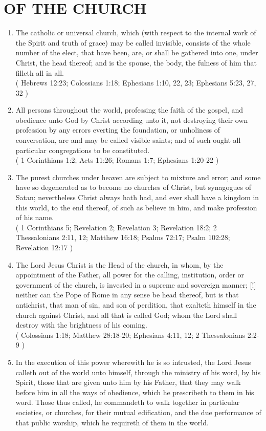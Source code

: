 \documentclass[12pt,a4paper]{book}
\begin{document}
\chapter{OF THE CHURCH}
\label{ch-chu}
\begin{enumerate}
\item The catholic or universal church, which (with respect to the internal work of the Spirit and truth of grace) may be called invisible, consists of the whole number of the elect, that have been, are, or shall be gathered into one, under Christ, the head thereof; and is the spouse, the body, the fulness of him that filleth all in all.\\
( Hebrews 12:23; Colossians 1:18; Ephesians 1:10, 22, 23; Ephesians 5:23, 27, 32 )
\item All persons throughout the world, professing the faith of the gospel, and obedience unto God by Christ according unto it, not destroying their own profession by any errors everting the foundation, or unholiness of conversation, are and may be called visible saints; and of such ought all particular congregations to be constituted.\\
( 1 Corinthians 1:2; Acts 11:26; Romans 1:7; Ephesians 1:20-22 )
\item The purest churches under heaven are subject to mixture and error; and some have so degenerated as to become no churches of Christ, but synagogues of Satan; nevertheless Christ always hath had, and ever shall have a kingdom in this world, to the end thereof, of such as believe in him, and make profession of his name.\\
( 1 Corinthians 5; Revelation 2; Revelation 3; Revelation 18:2; 2 Thessalonians 2:11, 12; Matthew 16:18; Psalms 72:17; Psalm 102:28; Revelation 12:17 )
\item The Lord Jesus Christ is the Head of the church, in whom, by the appointment of the Father, all power for the calling, institution, order or government of the church, is invested in a supreme and sovereign manner; [!] neither can the Pope of Rome in any sense be head thereof, but is that antichrist, that man of sin, and son of perdition, that exalteth himself in the church against Christ, and all that is called God; whom the Lord shall destroy with the brightness of his coming.\\
( Colossians 1:18; Matthew 28:18-20; Ephesians 4:11, 12; 2 Thessalonians 2:2-9 )
\item In the execution of this power wherewith he is so intrusted, the Lord Jesus calleth out of the world unto himself, through the ministry of his word, by his Spirit, those that are given unto him by his Father, that they may walk before him in all the ways of obedience, which he prescribeth to them in his word. Those thus called, he commandeth to walk together in particular societies, or churches, for their mutual edification, and the due performance of that public worship, which he requireth of them in the world.\\

\end{enumerate}
\end{document}
